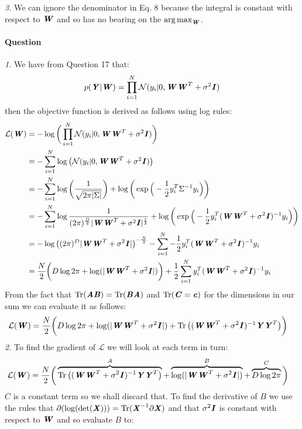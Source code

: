 \documentclass{article}
\newcounter{question}
\newcommand{\question}{\stepcounter{question}\paragraph{Question \thequestion}}
\newcommand{\mat}[1]{\textbf{\textit{#1}}}
\DeclareMathOperator{\Tr}{Tr}
\DeclareMathOperator{\argmax}{arg\,max}
\begin{document}
\emph{3.} We can ignore the denominator in Eq. 8 because the integral is constant with respect to $\mat{W}$ and so has no bearing on the $\argmax_\mat{W}$.
\question \emph{1.} We have from Question 17 that:
\begin{align*}
	p(\mat{Y}|\mat{W}) = \prod_{i=1}^N\mathcal{N}(y_i|0,\mat{W}\mat{W}^T + \sigma^2\mat{I})
\end{align*}
then the objective function is derived as follows using log rules:
\begin{align*}
	\mathcal{L}(\mat{W}) &= -\log\bigg(\prod_{i=1}^N\mathcal{N}(y_i|0,\mat{W}\mat{W}^T + \sigma^2\mat{I})\bigg) \\
	&= -\sum_{i=1}^N\log\big(\mathcal{N}(y_i|0,\mat{W}\mat{W}^T + \sigma^2\mat{I})\big) \\
	&= -\sum_{i=1}^N\log\bigg(\frac{1}{\sqrt{2\pi\lvert\Sigma\rvert}}\bigg)+\log\bigg(\exp\Big(-\frac{1}{2}y_i^T\Sigma^{-1} y_i\Big)\bigg) \\
	&= -\sum_{i=1}^N\log\frac{1}{(2\pi)^{\frac{D}{2}}\lvert\mat{W}\mat{W}^T+\sigma^2\mat{I}\rvert^{\frac{1}{2}}}+\log\bigg(\exp\Big(-\frac{1}{2}y_i^T(\mat{W}\mat{W}^T+\sigma^2\mat{I})^{-1} y_i\Big)\bigg) \\
	&= -\log\big((2\pi)^D\lvert\mat{W}\mat{W}^T+\sigma^2\mat{I}\vert\big)^{-\frac{N}{2}} - \sum_{i=1}^N-\frac{1}{2}y_i^T(\mat{W}\mat{W}^T+\sigma^2\mat{I})^{-1} y_i \\
	&= \frac{N}{2}\bigg(D\log2\pi + \log(\lvert\mat{W}\mat{W}^T+\sigma^2\mat{I}\vert)\bigg) + \frac{1}{2}\sum_{i=1}^Ny_i^T(\mat{W}\mat{W}^T+\sigma^2\mat{I})^{-1} y_i
\end{align*}
From the fact that $\Tr(\mat{A}\mat{B}) = \Tr(\mat{B}\mat{A})$ and $\Tr(\mat{C} = \mat{c})$ for the dimensions in our sum we can evaluate it as follows:
\begin{align*}
	\mathcal{L}(\mat{W}) &= \frac{N}{2}\bigg(D\log2\pi + \log(\lvert\mat{W}\mat{W}^T+\sigma^2\mat{I}\vert) + \Tr\big((\mat{W}\mat{W}^T+\sigma^2\mat{I})^{-1}\mat{Y}\mat{Y}^T\big)\bigg)
\end{align*}
\emph{2.} To find the gradient of $\mathcal{L}$ we will look at each term in turn:
\begin{align*}
	\mathcal{L}(\mat{W}) &= \frac{N}{2}\bigg(\overbrace{\Tr\big((\mat{W}\mat{W}^T+\sigma^2\mat{I})^{-1}\mat{Y}\mat{Y}^T\big)}^{A} + \overbrace{\log(\lvert\mat{W}\mat{W}^T+\sigma^2\mat{I}\vert)}^{B} + \overbrace{D\log2\pi}^{C}\bigg)
\end{align*}
$C$ is a constant term so we shall discard that. To find the derivative of $B$ we use the rules that $\partial(\log(\det(\mat{X}))) = \Tr(\mat{X}^{-1}\partial\mat{X})$ and that $\sigma^2\mat{I}$ is constant with respect to $\mat{W}$ and so evaluate $B$ to:
\end{document}

